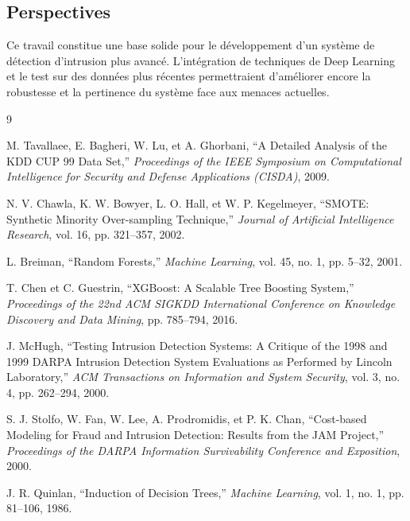 \documentclass[12pt,a4paper]{article}
\begin{document}
\subsection{Perspectives}

Ce travail constitue une base solide pour le développement d'un système de détection d'intrusion plus avancé. L'intégration de techniques de Deep Learning et le test sur des données plus récentes permettraient d'améliorer encore la robustesse et la pertinence du système face aux menaces actuelles.

\newpage
\begin{thebibliography}{9}

M. Tavallaee, E. Bagheri, W. Lu, et A. Ghorbani,
``A Detailed Analysis of the KDD CUP 99 Data Set,''
\textit{Proceedings of the IEEE Symposium on Computational Intelligence for Security and Defense Applications (CISDA)}, 2009.

N. V. Chawla, K. W. Bowyer, L. O. Hall, et W. P. Kegelmeyer,
``SMOTE: Synthetic Minority Over-sampling Technique,''
\textit{Journal of Artificial Intelligence Research}, vol. 16, pp. 321--357, 2002.

L. Breiman,
``Random Forests,''
\textit{Machine Learning}, vol. 45, no. 1, pp. 5--32, 2001.

T. Chen et C. Guestrin,
``XGBoost: A Scalable Tree Boosting System,''
\textit{Proceedings of the 22nd ACM SIGKDD International Conference on Knowledge Discovery and Data Mining}, pp. 785--794, 2016.

J. McHugh,
``Testing Intrusion Detection Systems: A Critique of the 1998 and 1999 DARPA Intrusion Detection System Evaluations as Performed by Lincoln Laboratory,''
\textit{ACM Transactions on Information and System Security}, vol. 3, no. 4, pp. 262--294, 2000.

S. J. Stolfo, W. Fan, W. Lee, A. Prodromidis, et P. K. Chan,
``Cost-based Modeling for Fraud and Intrusion Detection: Results from the JAM Project,''
\textit{Proceedings of the DARPA Information Survivability Conference and Exposition}, 2000.

J. R. Quinlan,
``Induction of Decision Trees,''
\textit{Machine Learning}, vol. 1, no. 1, pp. 81--106, 1986.

\end{thebibliography}
\end{document}
